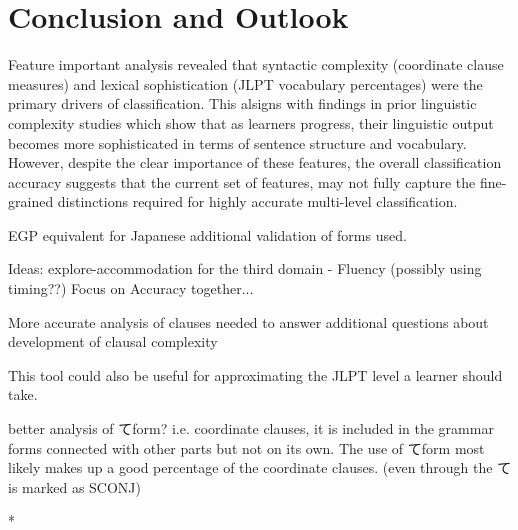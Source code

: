 \chapter{Conclusion and Outlook}






Feature important analysis revealed that syntactic complexity (coordinate clause measures) and lexical
sophistication (JLPT vocabulary percentages) were the primary drivers of classification. This alsigns with findings
in prior linguistic complexity studies which show that as learners progress, their linguistic output becomes more
sophisticated in terms of sentence structure and vocabulary. However, despite the clear importance of these features,
the overall classification accuracy suggests that the current set of features, may not fully capture the
fine-grained distinctions required for highly accurate multi-level classification.



EGP equivalent for Japanese additional validation of forms used.

Ideas: explore-accommodation for the third domain - Fluency (possibly using timing??)  Focus on Accuracy together...

More accurate analysis of clauses needed to answer additional questions about development of clausal complexity

This tool could also be useful for approximating the JLPT level a learner should take.

better analysis of てform? i.e. coordinate clauses, it is included in the grammar forms connected with other parts
but not on its own. The use of てform most likely makes up a good percentage of the coordinate clauses. (even through
the て is marked as SCONJ)


*